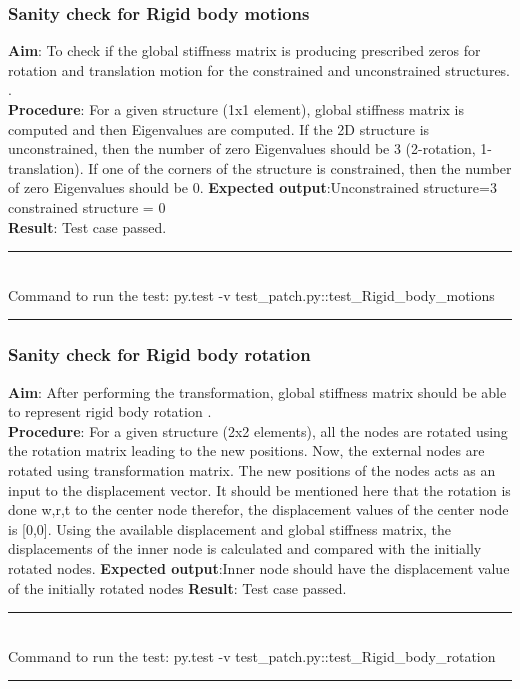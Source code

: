 \documentclass[fleqn, 12.5pt,a4paper]{report}
\begin{document}
\subsubsection{Sanity check for Rigid body motions}
\textbf{Aim}: To check if the global stiffness matrix is producing prescribed zeros for rotation and translation motion for the constrained and unconstrained structures. \cite{taylor2014feap}.\\
\textbf{Procedure}: For a given structure (1x1 element), global stiffness matrix is computed and then Eigenvalues are computed. If the 2D structure is unconstrained, then the number of zero Eigenvalues should be 3 (2-rotation, 1-translation). If one of the corners of the structure is constrained, then the number of zero Eigenvalues should be 0. \newline 
\textbf{Expected output}:Unconstrained structure=3 \newline
constrained structure = 0\\
\textbf{Result}: Test case passed.
\\
{\rule{\linewidth}{0.02cm}}\\
Command to run the test: {\selectfont py.test -v test{\_}patch.py::test{\_}Rigid{\_}body{\_}motions}\\
{\rule{\linewidth}{0.02cm}}

\subsubsection{Sanity check for Rigid body rotation}
\textbf{Aim}: After performing the transformation, global stiffness matrix should be able to represent rigid body rotation \cite{taylor2014feap}.\\
\textbf{Procedure}: For a given structure (2x2 elements), all the nodes are rotated using the rotation matrix leading to the new positions. Now, the external nodes are rotated using transformation matrix. The new positions of the nodes acts as an input to the displacement vector. It should be mentioned here that the rotation is done w,r,t to the center node therefor, the displacement values of the center node is [0,0]. Using the available displacement and global stiffness matrix, the displacements of the inner node is calculated and compared with the initially rotated nodes.\newline 
\textbf{Expected output}:Inner node should have the displacement value of the initially rotated nodes\newline
\textbf{Result}: Test case passed.
\\
{\rule{\linewidth}{0.02cm}}\\
Command to run the test: {\selectfont py.test -v test{\_}patch.py::test{\_}Rigid{\_}body{\_}rotation}\\
{\rule{\linewidth}{0.02cm}}
\\
\end{document}
